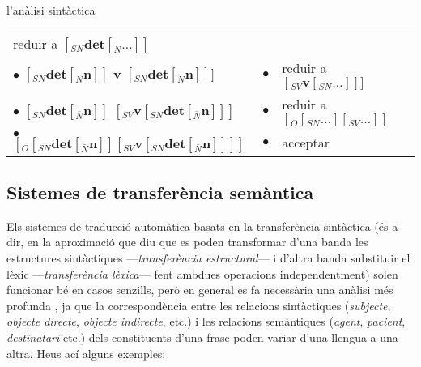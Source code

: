 \begin{persabermes}{l'anàlisi sintàctica}
\begin{center}
\begin{tabular}{l|r|l}
      reduir a $[_{SN} \textbf{det} [_{\bar{N}} \ldots ] ]$
      \\
      $\bullet$ $[_{SN} \textbf{det} [_{\bar{N}} \textbf{n} ] ]$
      \textbf{v} $[_{SN} \textbf{det} [_{\bar{N}} \textbf{n} ] ] ]$
      & 
      $\bullet$
      & 
      reduir a $[_{SV} \textbf{v} [_{SN} \ldots ] ] ]$
      \\
      $\bullet$ $[_{SN} \textbf{det} [_{\bar{N}} \textbf{n} ] ]$
      $[_{SV} \textbf{v}  [_{SN} \textbf{det} [_{\bar{N}} \textbf{n} ] ] ]$
      & 
      $\bullet$
      & 
      reduir a $[_O [_{SN} \ldots ] [_{SV} \ldots ] ]$
      \\
      $\bullet$ $[_O [_{SN} \textbf{det} [_{\bar{N}} \textbf{n} ] ] [_{SV} \textbf{v}  [_{SN} \textbf{det} [_{\bar{N}} \textbf{n} ]
      ] ] ]$
      & 
      $\bullet$
      & 
      acceptar
      \\
      \hline
    \end{tabular}
  \end{center}
\end{persabermes}

\subsection{Sistemes de transferència semàntica}
\label{s3:transsem}

Els sistemes de traducció automàtica basats en la transferència
sintàctica (és a dir, en la aproximació que diu que es poden
transformar d'una banda les estructures sintàctiques
---\emph{transferència estructural}--- i d'altra banda substituir el
lèxic ---\emph{transferència lèxica}--- fent ambdues operacions
independentment) solen funcionar bé en casos senzills, però en general
es fa necessària una anàlisi més profunda \citep{hovy93j}, ja que la
correspondència entre les relacions sintàctiques (\emph{subjecte},
\emph{objecte directe}, \emph{objecte indirecte}, etc.)  i les
relacions semàntiques (\emph{agent}, \emph{pacient},
\emph{destinatari} etc.)  dels constituents d'una frase poden variar
d'una llengua a una altra.  Heus ací alguns exemples:

